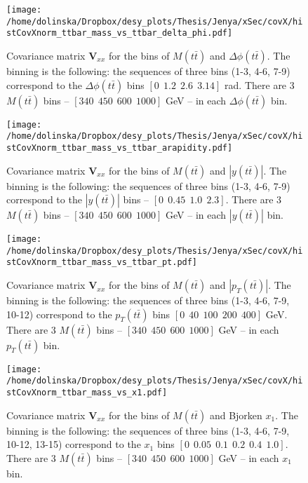 \begin{figure}[p]
  \centering
  \texttt{[image: /home/dolinska/Dropbox/desy\_plots/Thesis/Jenya/xSec/covX/histCovXnorm\_ttbar\_mass\_vs\_ttbar\_delta\_phi.pdf]}
  \caption{Covariance matrix $\mathbf{V}_{xx}$ for the bins of $M(t\bar{t})$ and $\Delta\phi(t\bar{t})$. The binning is the following:
  the sequences of three bins (1-3, 4-6, 7-9) correspond to the $\Delta\phi(t\bar{t})$ bins $[0\:\:1.2\:\:2.6\:\:3.14]$ rad.
          There are 3 $M(t\bar{t})$ bins -- $[340\:\:450\:\:600\:\:1000]$ GeV -- in each $\Delta\phi(t\bar{t})$ bin.}
  \label{fig:corr_matr_phi_Mtt}
\end{figure}

\begin{figure}[p]
  \centering
  \texttt{[image: /home/dolinska/Dropbox/desy\_plots/Thesis/Jenya/xSec/covX/histCovXnorm\_ttbar\_mass\_vs\_ttbar\_arapidity.pdf]}
  \caption{Covariance matrix $\mathbf{V}_{xx}$ for the bins of $M(t\bar{t})$ and $|y(t\bar{t})|$. The binning is the following:
  the sequences of three bins (1-3, 4-6, 7-9) correspond to the $|y(t\bar{t})|$ bins -- $[0\:\:0.45\:\:1.0\:\:2.3]$.
          There are 3 $M(t\bar{t})$ bins -- $[340\:\:450\:\:600\:\:1000]$ GeV -- in each $|y(t\bar{t})|$ bin.}
  \label{fig:corr_matr_ytt_Mtt}
\end{figure}

\begin{figure}[p]
  \centering
  \texttt{[image: /home/dolinska/Dropbox/desy\_plots/Thesis/Jenya/xSec/covX/histCovXnorm\_ttbar\_mass\_vs\_ttbar\_pt.pdf]}
  \caption{Covariance matrix $\mathbf{V}_{xx}$ for the bins of $M(t\bar{t})$ and $|p_{T}(t\bar{t})|$. The binning is the following:
  the sequences of three bins (1-3, 4-6, 7-9, 10-12) correspond to the $p_{T}(t\bar{t})$ bins $[0\:\:40\:\:100\:\:200\:\:400]$ GeV.
          There are 3 $M(t\bar{t})$ bins -- $[340\:\:450\:\:600\:\:1000]$ GeV -- in each $p_{T}(t\bar{t})$ bin.}
  \label{fig:corr_matr_pttt_Mtt}
\end{figure}

\begin{figure}[p]
  \centering
  \texttt{[image: /home/dolinska/Dropbox/desy\_plots/Thesis/Jenya/xSec/covX/histCovXnorm\_ttbar\_mass\_vs\_x1.pdf]}
  \caption{Covariance matrix $\mathbf{V}_{xx}$ for the bins of $M(t\bar{t})$ and Bjorken $x_{1}$. The binning is the following:
  the sequences of three bins (1-3, 4-6, 7-9, 10-12, 13-15) correspond to the $x_{1}$ bins $[0\:\:0.05\:\:0.1\:\:0.2\:\:0.4\:\:1.0]$.
          There are 3 $M(t\bar{t})$ bins -- $[340\:\:450\:\:600\:\:1000]$ GeV -- in each $x_{1}$ bin.}
  \label{fig:corr_matr_x1_Mtt}
\end{figure}

